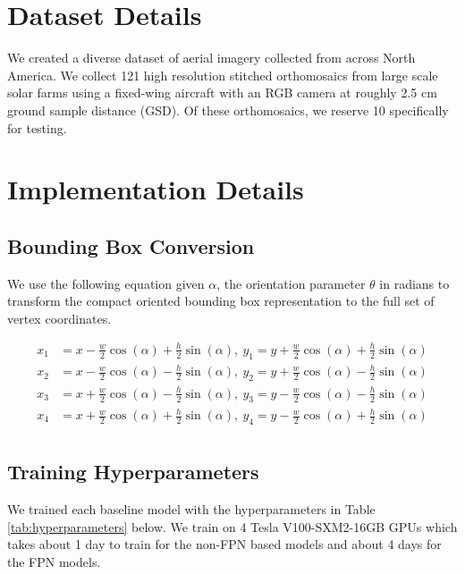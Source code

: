 \newpage
\appendix

\section{Dataset Details}
\label{appendix:dataset}

We created a diverse dataset of aerial imagery collected from across North America. We collect 121 high resolution stitched orthomosaics from large scale solar farms using a fixed-wing aircraft with an RGB camera at roughly 2.5 cm ground sample distance (GSD). Of these orthomosaics, we reserve 10 specifically for testing.



\section{Implementation Details}
\label{appendix:implementation}

\subsection{Bounding Box Conversion}
We use the following equation given $\alpha$, the orientation parameter $\theta$ in radians to transform the compact oriented bounding box representation to the full set of vertex coordinates.

\begin{equation}
\label{eq:vertices}
\begin{aligned}
    x_1 &= x - \frac{w}{2} \cos(\alpha) + \frac{h}{2} \sin(\alpha), \ y_1 = y + \frac{w}{2} \cos(\alpha) + \frac{h}{2} \sin(\alpha) \\
    x_2 &= x - \frac{w}{2} \cos(\alpha) - \frac{h}{2} \sin(\alpha), \ y_2 = y + \frac{w}{2} \cos(\alpha) - \frac{h}{2} \sin(\alpha) \\
    x_3 &= x + \frac{w}{2} \cos(\alpha) - \frac{h}{2} \sin(\alpha), \ y_3 = y - \frac{w}{2} \cos(\alpha) - \frac{h}{2} \sin(\alpha) \\
    x_4 &= x + \frac{w}{2} \cos(\alpha) + \frac{h}{2} \sin(\alpha), \ y_4 = y - \frac{w}{2} \cos(\alpha) + \frac{h}{2} \sin(\alpha) \\
\end{aligned}
\end{equation}

\subsection{Training Hyperparameters}
We trained each baseline model with the hyperparameters in Table \ref{tab:hyperparameters} below. We train on 4 Tesla V100-SXM2-16GB GPUs which takes about 1 day to train for the non-FPN based models and about 4 days for the FPN models.

